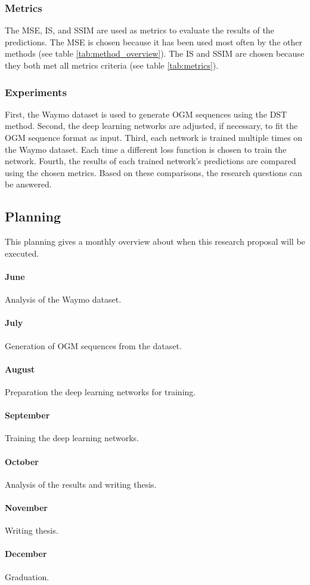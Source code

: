 \subsubsection{Metrics} 
The \gls{MSE}, \gls{IS}, and \gls{SSIM} are used as metrics to evaluate the results of the predictions. The \gls{MSE} is chosen because it has been used most often by the other methods (see table \ref{tab:method_overview}). The \gls{IS} and \gls{SSIM} are chosen because they both met all metrics criteria (see table \ref{tab:metrics}). 

\subsubsection{Experiments}
First, the Waymo \cite{sun2020scalability} dataset is used to generate \gls{OGM} sequences using the \gls{DST} method. Second, the deep learning networks are adjusted, if necessary, to fit the \gls{OGM} sequence format as input. Third, each network is trained multiple times on the Waymo \cite{sun2020scalability} dataset. Each time a different loss function is chosen to train the network. Fourth, the results of each trained network's predictions are compared using the chosen metrics. Based on these comparisons, the research questions can be answered. 

\subsection{Planning} \label{subsec:rp_planning}
This planning gives a monthly overview about when this research proposal will be executed. 

\paragraph{June} Analysis of the Waymo \cite{sun2020scalability} dataset.
\paragraph{July} Generation of \gls{OGM} sequences from the dataset.
\paragraph{August} Preparation the deep learning networks for training.
\paragraph{September} Training the deep learning networks.
\paragraph{October} Analysis of the results and writing thesis. 
\paragraph{November} Writing thesis.
\paragraph{December} Graduation.



